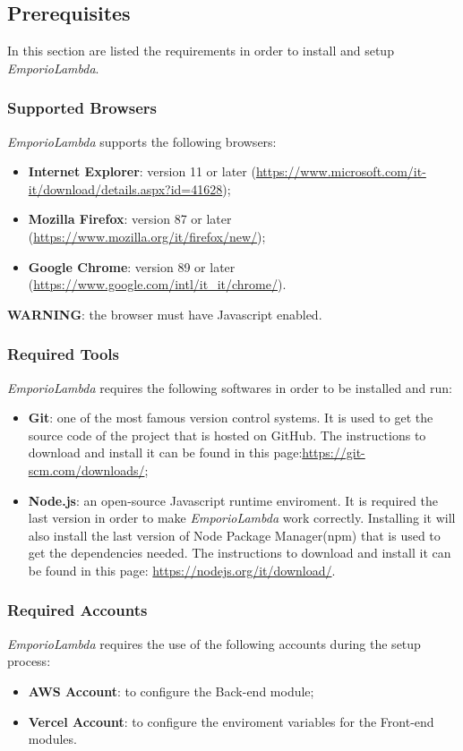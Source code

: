 \subsection{Prerequisites}
In this section are listed the requirements in order to install and setup \textit{EmporioLambda}.

\subsubsection{Supported Browsers}
\textit{EmporioLambda} supports the following browsers:
\begin{itemize}
\item \textbf{Internet Explorer}: version 11 or later (\url{https://www.microsoft.com/it-it/download/details.aspx?id=41628});
\item \textbf{Mozilla Firefox}: version 87 or later (\url{https://www.mozilla.org/it/firefox/new/});
\item \textbf{Google Chrome}: version 89 or later (\url{https://www.google.com/intl/it_it/chrome/}).
\end{itemize}
\textbf{WARNING}: the browser must have Javascript enabled.

\subsubsection{Required Tools}
\textit{EmporioLambda} requires the following softwares in order to be installed and run:
\begin{itemize}
\item \textbf{Git}: one of the most famous version control systems. It is used to get the source code of the project that is hosted on GitHub. The instructions to download and install it can be found in this page:\url{https://git-scm.com/downloads/};
\item \textbf{Node.js}: an open-source Javascript runtime enviroment. It is required the last version in order to make \textit{EmporioLambda} work correctly. Installing it will also install the last version of Node Package Manager(npm) that is used to get the dependencies needed. The instructions to download and install it can be found in this page: \url{https://nodejs.org/it/download/}.
\end{itemize}

\subsubsection{Required Accounts}
\textit{EmporioLambda} requires the use of the following accounts during the setup process:
\begin{itemize}
\item \textbf{AWS Account}: to configure the Back-end module;
\item \textbf{Vercel Account}: to configure the enviroment variables for the Front-end modules.
\end{itemize}

